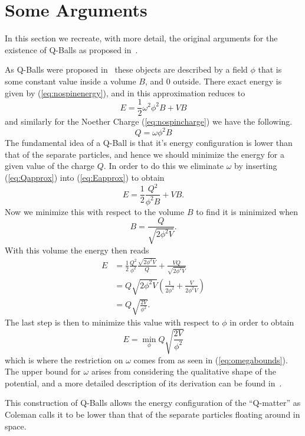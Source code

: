 \section{Some Arguments}\label{sec:appargs}
In this section we recreate, with more detail, the original arguments for the
existence of Q-Balls as proposed in~\cite{coleman}.

As Q-Balls were proposed in~\cite{coleman} these objects are described by a
field \(\phi\) that is some constant value inside a volume \(B\), and 0 outside.
There exact energy is given by (\ref{eq:nospinenergy}), and in this
approximation reduces to
\begin{equation}\label{eq:Eapprox}
    E = \frac{1}{2}\omega^2\phi^2B + VB
\end{equation}
and similarly for the Noether Charge (\ref{eq:nospincharge}) we have the following.
\begin{equation}\label{eq:Qapprox}
    Q = \omega \phi^2 B
\end{equation}
The fundamental idea of a Q-Ball is that it's energy configuration is lower than
that of the separate particles, and hence we should minimize the energy for a
given value of the charge \(Q\). In order to do this we eliminate \(\omega\) by
inserting (\ref{eq:Qapprox}) into (\ref{eq:Eapprox}) to obtain
\begin{equation}
    E = \frac{1}{2}\frac{Q^2}{\phi^2 B} + VB.
\end{equation}
Now we minimize this with respect to the volume \(B\) to find it is minimized when
\begin{equation}
    B = \frac{Q}{\sqrt{2\phi^2 V}}.
\end{equation}
With this volume the energy then reads
\begin{align}
    E & = \frac{1}{2}\frac{Q^2}{\phi^2}\frac{\sqrt{2\phi^2 V}}{Q} + \frac{VQ}{\sqrt{2\phi^2 V}} \\
      & = Q\sqrt{2\phi^2 V}\left( \frac{1}{2\phi^2} + \frac{V}{2\phi^2 V}\right) \\
      & = Q \sqrt{\frac{2V}{\phi^2}}.
\end{align}
The last step is then to minimize this value with respect to \(\phi\) in order
to obtain
\begin{equation}
    E = \min_\phi Q \sqrt{\frac{2V}{\phi^2}}
\end{equation}
which is where the restriction on \(\omega\) comes from as seen in
(\ref{eq:omegabounds}). The upper bound for \(\omega\) arises from considering
the qualitative shape of the potential, and a more detailed description of its
derivation can be found in~\cite{coleman, qball6}.

This construction of Q-Balls allows the energy configuration of the ``Q-matter''
as Coleman calls it to be lower than that of the separate particles floating
around in space.